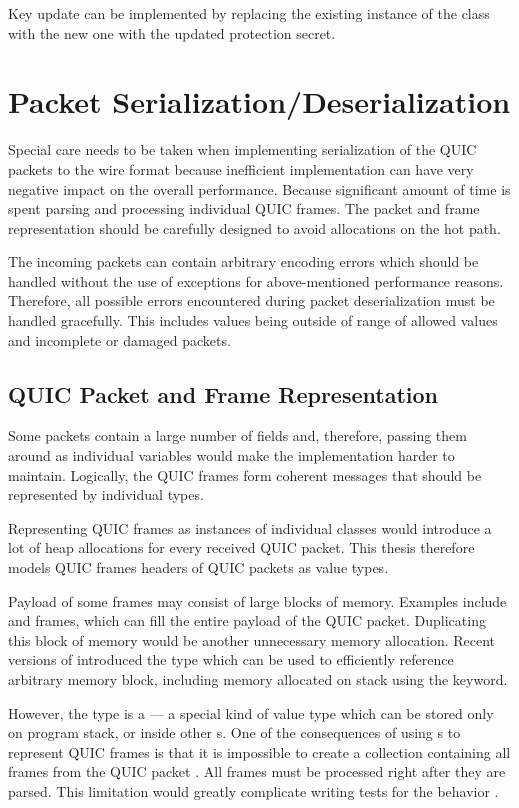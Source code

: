 Key update can be implemented by replacing the existing instance of the
\CryptoSeal{} class with the new one with the updated protection secret.

\section{Packet Serialization/Deserialization}

Special care needs to be taken when implementing serialization of the QUIC packets to the wire
format because inefficient implementation can have very negative impact on the overall performance.
Because significant amount of time is spent parsing and processing individual QUIC frames. The
packet and frame representation should be carefully designed to avoid allocations on the hot path.

The incoming packets can contain arbitrary encoding errors which should be handled without the use
of exceptions for above-mentioned performance reasons. Therefore, all possible errors encountered
during packet deserialization must be handled gracefully. This includes values being outside of
range of allowed values and incomplete or damaged packets.

\subsection{QUIC Packet and Frame Representation}

Some packets contain a large number of fields and, therefore, passing them around as individual
variables would make the implementation harder to maintain. Logically, the QUIC frames form coherent
messages that should be represented by individual \dotnet{} types.

Representing QUIC frames as instances of individual classes would introduce a lot of heap
allocations for every received QUIC packet. This thesis therefore models QUIC frames headers of QUIC
packets as value types.

Payload of some frames may consist of large blocks of memory. Examples include \STREAM{} and
\CRYPTO{} frames, which can fill the entire payload of the QUIC packet. Duplicating this block of
memory would be another unnecessary memory allocation. Recent versions of \dotnet{}  introduced the  type which can be used to efficiently reference arbitrary
memory block, including memory allocated on stack using the  keyword.

However, the  type is a  --- a special kind of value type which can
be stored only on program stack, or inside other s. One of the consequences of
using s to represent QUIC frames is that it is impossible to create a collection
containing all frames from the QUIC packet . All frames must be processed right
after they are parsed. This limitation would greatly complicate writing tests for the
 behavior .

